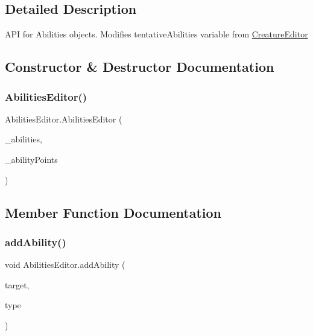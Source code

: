 \subsection{Detailed Description}
A\+PI for Abilities objects. Modifies tentative\+Abilities variable from \mbox{\hyperlink{class_creature_editor}{Creature\+Editor}} 



\subsection{Constructor \& Destructor Documentation}
\mbox{\label{class_abilities_editor_aaeefe3c664fe012a1649e9d336191766}} 
\subsubsection{\texorpdfstring{Abilities\+Editor()}{AbilitiesEditor()}}
{\footnotesize\ttfamily Abilities\+Editor.\+Abilities\+Editor (\begin{DoxyParamCaption}\item[{Dictionary$<$ string, \mbox{\hyperlink{class_ability}{Ability}} $>$}]{\+\_\+abilities,  }\item[{int}]{\+\_\+ability\+Points }\end{DoxyParamCaption})}



\subsection{Member Function Documentation}
\mbox{\label{class_abilities_editor_aa85324dcb2b8c30fa6c31c17fa4e5020}} 
\subsubsection{\texorpdfstring{add\+Ability()}{addAbility()}}
{\footnotesize\ttfamily void Abilities\+Editor.\+add\+Ability (\begin{DoxyParamCaption}\item[{string}]{target,  }\item[{\mbox{\hyperlink{_abilities_editor_8cs_ae01c380f385ee9eeb03333f20711ab5a}{ability\+Type}}}]{type }\end{DoxyParamCaption})}



